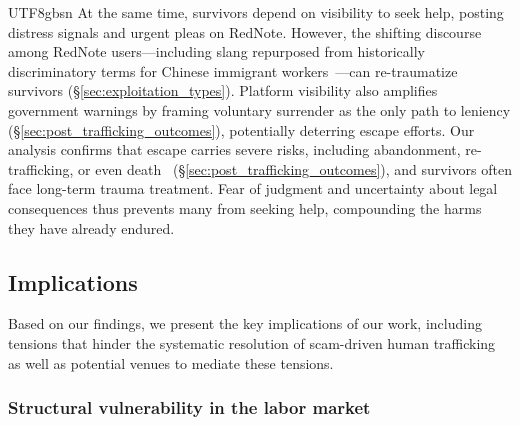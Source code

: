 \documentclass[sigconf,nonacm]{acmart}
\newcommand{\rev}[1]{#1}
\newcommand{\add}[1]{#1}
\begin{document}
\begin{CJK}{UTF8}{gbsn}
\add{At the same time, survivors depend on visibility to seek help, posting distress signals and urgent pleas on RedNote. However, the shifting discourse among RedNote users---including slang repurposed from historically discriminatory terms for Chinese immigrant workers~\cite{hui-cswm95}---can re-traumatize survivors (\S\ref{sec:exploitation_types}). Platform visibility also amplifies government warnings by framing voluntary surrender as the only path to leniency (\S\ref{sec:post_trafficking_outcomes}), potentially deterring escape efforts. Our analysis confirms that escape carries severe risks, including abandonment, re-trafficking, or even death~\cite{sarkar2025cyberslavery, luong2024understanding, lazarus2025assessing, ohchr2023trafficking} (\S\ref{sec:post_trafficking_outcomes}), and survivors often face long-term trauma treatment. Fear of judgment and uncertainty about legal consequences thus prevents many from seeking help, compounding the harms they have already endured.}

\subsection{Implications}

Based on our findings, we present the key implications of our work, including tensions that hinder the systematic resolution of scam-driven human trafficking as well as potential venues to mediate these tensions.

\subsubsection{\rev{Structural vulnerability in the labor market}}


\end{CJK}
\end{document}
